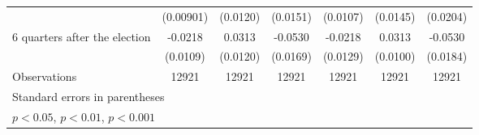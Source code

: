 \begin{table}[htbp]
\begin{tabular}{l*{6}{c}}
                    &   (0.00901)         &    (0.0120)         &    (0.0151)         &    (0.0107)         &    (0.0145)         &    (0.0204)         \\
[1em]
 6 quarters after the election&     -0.0218\sym{*}  &      0.0313\sym{**} &     -0.0530\sym{**} &     -0.0218         &      0.0313\sym{**} &     -0.0530\sym{**} \\
                    &    (0.0109)         &    (0.0120)         &    (0.0169)         &    (0.0129)         &    (0.0100)         &    (0.0184)         \\
\hline
Observations        &       12921         &       12921         &       12921         &       12921         &       12921         &       12921         \\
\hline\hline
\multicolumn{7}{l}{\footnotesize Standard errors in parentheses}\\
\multicolumn{7}{l}{\footnotesize \sym{*} \(p<0.05\), \sym{**} \(p<0.01\), \sym{***} \(p<0.001\)}\\
\end{tabular}
\end{table}
